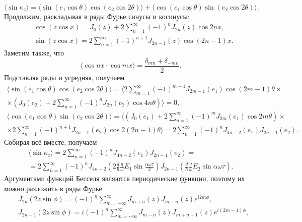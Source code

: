 \begin{equation*}
  \langle\sin\kappa_z\rangle =
  \langle\sin(e_1\cos\theta)\cos(e_2\cos2\theta)\rangle +
  \langle\cos(e_1\cos\theta)\sin(e_2\cos2\theta)\rangle.
\end{equation*}
Продолжим, раскладывая в ряды Фурье синусы и косинусы:
\begin{align*}
  &\cos(z\cos x) = J_0(z) + 2\sum_{n=1}^\infty (-1)^n J_{2n}(z)\cos2nx,\\
  &\sin(z\cos x) = 2\sum_{n=1}^\infty (-1)^{n+1} J_{2n-1}(z)\cos(2n-1)x.
\end{align*}
Заметим также, что
\begin{equation*}
    \langle \cos nx \cdot \cos mx \rangle = \frac{\delta_{mn}+\delta_{-mn}}{2}.
\end{equation*}
Подставляя ряды и усредняя, получаем
\begin{gather*}
  \langle\sin(e_1\cos\theta)\cos(e_2\cos2\theta)\rangle = \Bigg\langle2\sum_{m=1}^\infty (-1)^{m+1} J_{2m-1}(e_1)\cos(2m-1)\theta\times\\\times\left(J_0(e_2) + 2\sum_{n=1}^\infty (-1)^n J_{2n}(e_2)\cos4n\theta\right)\Bigg\rangle = 0,
\end{gather*}
\begin{gather*}
  \langle\cos(e_1\cos\theta)\sin(e_2\cos2\theta)\rangle =
  \Bigg\langle\left(J_0(e_1) + 2\sum_{n=1}^\infty (-1)^m
  J_{2m}(e_1)\cos2m\theta\right)\times\\\times2\sum_{n=1}^\infty (-1)^{n+1}
  J_{2n-1}(e_2)\cos2(2n-1)\theta\Bigg\rangle = 2\sum_{n=1}^\infty (-1)^n
  J_{4n-2}(e_1)J_{2n-1}(e_2).
\end{gather*}
Собирая всё вместе, получаем
\begin{gather*}
  \langle\sin\kappa_z\rangle =
  2\sum_{n=1}^\infty (-1)^n J_{4n-2}(e_1)J_{2n-1}(e_2)=\\=
  2\sum_{n=1}^\infty (-1)^n
  J_{4n-2}\left(2\frac{d}{\hbar}\frac{q}{\omega}E_1\sin\frac{\alpha\omega\tau}{2}\right)J_{2n-1}\left(\frac{d}{\hbar}\frac{q}{\omega}E_2\sin\alpha\omega\tau\right).
\end{gather*}
Аргументами функций Бесселя являются периодические функции, поэтому их можно разложить в ряды Фурье
\begin{align*}
    & J_{2n}(2z\sin\phi) =
    (-1)^n\sum_{m=-\infty}^\infty J_{m+n}(z)J_{m-n}(z) e^{i2m\phi},\\
    & J_{2n-1}(2z\sin\phi) =
    i(-1)^{n}\sum_{m=-\infty}^\infty J_{m-n}(z)J_{m+n-1}(z)e^{i(2m-1)\phi},
\end{align*}

